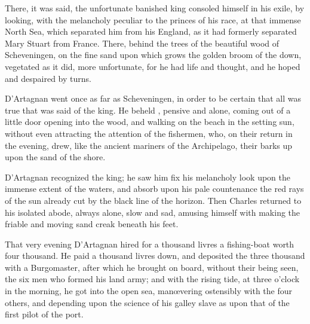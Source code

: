 There, it was said, the unfortunate banished king consoled himself in his exile, by looking, with the melancholy peculiar to the princes of his race, at that immense North Sea, which separated him from his England, as it had formerly separated Mary Stuart from France. There, behind the trees of the beautiful wood of Scheveningen, on the fine sand upon which grows the golden broom of the down,  vegetated as it did, more unfortunate, for he had life and thought, and he hoped and despaired by turns.

D'Artagnan went once as far as Scheveningen, in order to be certain that all was true that was said of the king. He beheld , pensive and alone, coming out of a little door opening into the wood, and walking on the beach in the setting sun, without even attracting the attention of the fishermen, who, on their return in the evening, drew, like the ancient mariners of the Archipelago, their barks up upon the sand of the shore.

D'Artagnan recognized the king; he saw him fix his melancholy look upon the immense extent of the waters, and absorb upon his pale countenance the red rays of the sun already cut by the black line of the horizon. Then Charles returned to his isolated abode, always alone, slow and sad, amusing himself with making the friable and moving sand creak beneath his feet.

That very evening D'Artagnan hired for a thousand livres a fishing-boat worth four thousand. He paid a thousand livres down, and deposited the three thousand with a Burgomaster, after which he brought on board, without their being seen, the six men who formed his land army; and with the rising tide, at three o'clock in the morning, he got into the open sea, manœvering ostensibly with the four others, and depending upon the science of his galley slave as upon that of the first pilot of the port. 